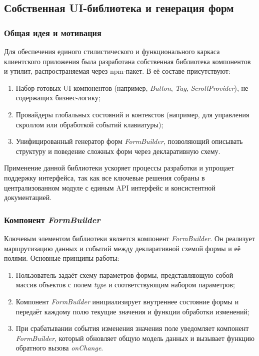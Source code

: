 \subsection{Собственная UI-библиотека и генерация форм}

\subsubsection{Общая идея и мотивация}
Для обеспечения единого стилистического и функционального каркаса клиентского приложения была разработана собственная библиотека компонентов и утилит, распространяемая через npm-пакет. В её составе присутствуют:
\begin{enumerate}
  \item Набор готовых UI-компонентов (например, \textit{Button}, \textit{Tag}, \textit{ScrollProvider}), не содержащих бизнес-логику;
  \item Провайдеры глобальных состояний и контекстов (например, для управления скроллом или обработкой событий клавиатуры);
  \item Унифицированный генератор форм \textit{FormBuilder}, позволяющий описывать структуру и поведение сложных форм через декларативную схему.
\end{enumerate}
Применение данной библиотеки ускоряет процессы разработки и упрощает поддержку интерфейса, так как все ключевые решения собраны в централизованном модуле с единым API интерфейс и консистентной документацией.

\subsubsection{Компонент \textit{FormBuilder}}
Ключевым элементом библиотеки является компонент \textit{FormBuilder}. Он реализует маршрутизацию данных и событий между декларативной схемой формы и её полями. Основные принципы работы:
\begin{enumerate}
  \item Пользователь задаёт схему параметров формы, представляющую собой массив объектов с полем \textit{type} и соответствующим набором параметров;
  \item Компонент \textit{FormBuilder} инициализирует внутреннее состояние формы и передаёт каждому полю текущие значения и функции обработки изменений;
  \item При срабатывании события изменения значения поле уведомляет компонент \textit{FormBuilder}, который обновляет общую модель данных и вызывает функцию обратного вызова \textit{onChange}.
\end{enumerate}

